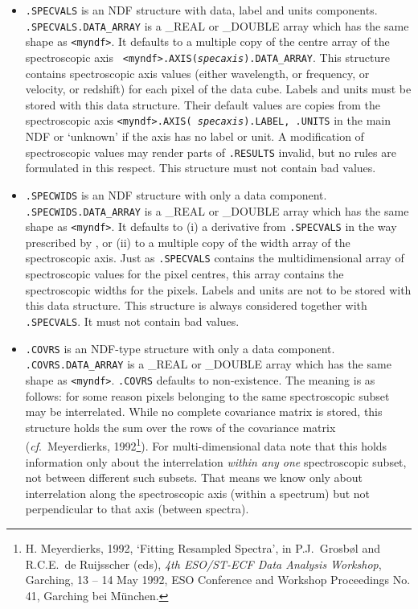 \begin{itemize}
\item{\tt .SPECVALS} is an NDF structure with data, label and units
   components. {\tt .SPECVALS.\-DATA\_\-ARRAY} is a \_REAL or \_DOUBLE
   array which has the same shape as {\tt <myndf>}. It defaults to a
   multiple copy of the centre array of the spectroscopic axis {\tt
   <myndf>.AXIS\-({\it specaxis})\-.DATA\_\-ARRAY}. This structure
   contains spectroscopic axis values (either wavelength, or frequency,
   or velocity, or redshift) for each pixel of the data cube. Labels and
   units must be stored with this data structure. Their default values
   are copies from the spectroscopic axis {\tt <myndf>.AXIS({\it
   specaxis}).LABEL, .UNITS} in the main NDF or `unknown' if the axis
   has no label or unit. A modification of spectroscopic values may
   render parts of {\tt .RESULTS} invalid, but no rules are formulated
   in this respect. This structure must not contain bad values.

\item{\tt .SPECWIDS} is an NDF structure with only a data component.
   {\tt .SPECWIDS.DATA\_\-ARRAY} is a \_REAL or \_DOUBLE array which has
   the same shape as {\tt <myndf>}. It defaults to (i) a derivative from
   {\tt .SPECVALS} in the way prescribed by
,
   or (ii) to a multiple copy of the width array of the spectroscopic
   axis. Just as {\tt .SPECVALS} contains the multidimensional array of
   spectroscopic values for the pixel centres, this array contains the
   spectroscopic widths for the pixels. Labels and units are not to be
   stored with this data structure. This structure is always considered
   together with {\tt .SPECVALS}. It must not contain bad values.

\item{\tt .COVRS} is an NDF-type structure with only a data component.
   {\tt .COVRS.DATA\_ARRAY} is a \_REAL or \_DOUBLE array which has the
   same shape as {\tt <myndf>}. {\tt .COVRS} defaults to
   non-existence. The meaning is as follows: for some reason pixels
   belonging to the same spectroscopic subset may be interrelated. While
   no complete covariance matrix is stored, this structure holds the sum
   over the rows of the covariance matrix ({\it cf}.\ Meyerdierks,
   1992\footnote{H. Meyerdierks, 1992, `Fitting Resampled Spectra', in
   P.J.\ Grosb\o l and R.C.E.\ de Ruijsscher (eds), {\it 4th ESO/ST-ECF
   Data Analysis Workshop}, Garching, 13 -- 14 May 1992, ESO Conference
   and Workshop Proceedings No. 41, Garching bei M\"unchen.}). For
   multi-dimensional data note that this holds information only about
   the interrelation {\it within any one} spectroscopic subset, not
   between different such subsets. That means we know only about
   interrelation along the spectroscopic axis (within a spectrum) but
   not perpendicular to that axis (between spectra). 


\end{itemize}
